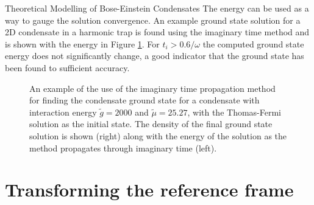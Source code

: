 \begin{chapter}{\label{cha:theoretical_model}Theoretical Modelling of Bose-Einstein Condensates}
The energy can be used as a way to gauge the solution convergence. An example ground state solution for a 2D condensate in a harmonic trap is found using the imaginary time method and is shown with the energy in Figure \ref{fig_imagtimesolgs}. For $t_i > 0.6/\omega$ the computed ground state energy does not significantly change, a good indicator that the ground state has been found to sufficient accuracy.
\begin{figure}[!ht]
	\centering
  \hspace{0.04\linewidth}
	\caption{An example of the use of the imaginary time propagation method for finding the condensate ground state for a condensate with interaction energy $\tilde{g}=2000$ and $\tilde{\mu}=25.27$, with the Thomas-Fermi solution as the initial state. The density of the final ground state solution is shown (right) along with the energy of the solution as the method propagates through imaginary time (left).}\label{fig_imagtimesolgs}
\end{figure}

\section{\label{section:movframe} Transforming the reference frame}

\end{chapter}
